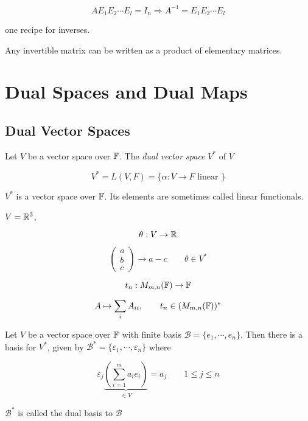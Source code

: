 \documentclass[a4paper]{article}
\begin{document}
\[ A E_{1} E_{2} \cdots E_{l} = I_{n} \Rightarrow A^{-1} = E_{1} E_{2} \cdots E_{l} \]

one recipe for inverses.

\begin{prop} 
	Any invertible matrix can be written as a product of elementary matrices.
\end{prop}


\section{Dual Spaces and Dual Maps}
\subsection{Dual Vector Spaces}

\begin{defi}
	Let $ V $ be a vector space over $ \mathbb{F} $. The \emph{dual vector space} $ V^{*} $ of $ V $
	
	\[ V^{*} = L(V,F) = \{ \alpha : V \to F \text{ linear } \}  \]
\end{defi}

$ V^{*} $ is a vector space over $ \mathbb{F} $. Its elements are sometimes called linear functionals. 

\begin{eg}
	$ V = \mathbb{R}^{3} $,
	
	\[ \theta: V \to \mathbb{R} \]
	
	\[ \begin{pmatrix}
	a \\
	b\\
	c
	\end{pmatrix} \to a - c \qquad \theta \in V^{*} \]
\end{eg}

\begin{eg}
	\[ t_{n}:  M_{m,n}(\mathbb{F}) \to \mathbb{F} \]
	
	\[ A \mapsto \sum_{i} A_{ii}, \qquad t_{n} \in (M_{m,n}(\mathbb{F}))^{*} \]
\end{eg}

\begin{lemma} 
	Let $ V $ be a vector space over $ \mathbb{F} $ with finite basis $ \mathcal{B} = \{ e_{1},\cdots,e_{n} \} $. Then there is a basis for $ V^{*} $, given by $ \mathcal{B}^{*} = \{  \varepsilon_{1},\cdots,\varepsilon_{n} \}  $ where 
	
	\[ \varepsilon_{j} \underbrace{\left(   \sum_{i=1}^{m}  a_{i} e_{i}  \right) }_{\in V} = a_{j}  \qquad 1 \leq j \leq n \]
	
	$ \mathcal{B}^{*} $ is called the dual basis to $ \mathcal{B} $
\end{lemma}
\end{document}
